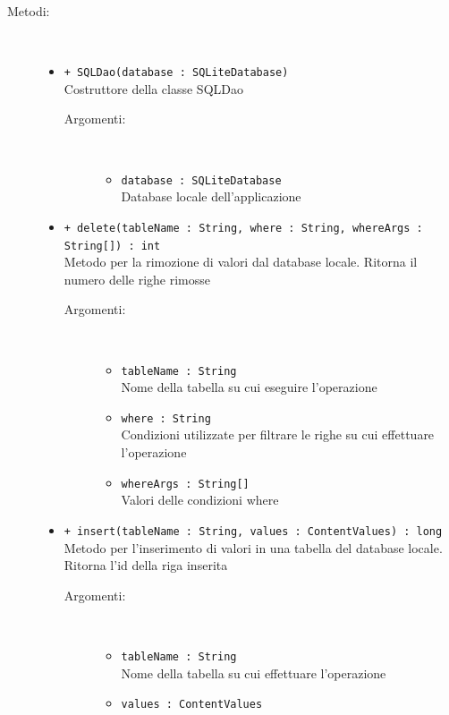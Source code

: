 \documentclass[../DefinizioneDiProdotto.tex]{subfiles}
\begin{document}
\begin{description}
\begin{itemize}
	\end{itemize}
	\item[Metodi:] \
	\begin{itemize}
		\item \texttt{+ SQLDao(database : SQLiteDatabase)}\\
		Costruttore della classe SQLDao
		\begin{description}
			\item[Argomenti:] \
			\begin{itemize}
				\item \texttt{database : SQLiteDatabase}\\
				Database locale dell'applicazione\end{itemize}
		\end{description}
		\item \texttt{+ delete(tableName : String, where : String, whereArgs : String[]) : int}\\
		Metodo per la rimozione di valori dal database locale. Ritorna il numero delle righe rimosse
		\begin{description}
			\item[Argomenti:] \
			\begin{itemize}
				\item \texttt{tableName : String}\\
				Nome della tabella su cui eseguire l'operazione\item \texttt{where : String}\\
				Condizioni utilizzate per filtrare le righe su cui effettuare l'operazione\item \texttt{whereArgs : String[]}\\
				Valori delle condizioni where\end{itemize}
		\end{description}
		\item \texttt{+ insert(tableName : String, values : ContentValues) : long}\\
		Metodo per l'inserimento di valori in una tabella del database locale. Ritorna l'id della riga inserita
		\begin{description}
			\item[Argomenti:] \
			\begin{itemize}
				\item \texttt{tableName : String}\\
				Nome della tabella su cui effettuare l'operazione\item \texttt{values : ContentValues}\\

\end{itemize}
\end{description}
\end{itemize}
\end{description}
\end{document}
